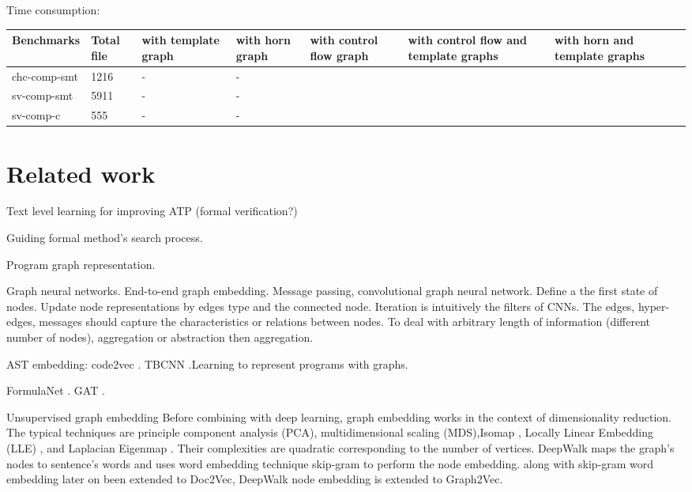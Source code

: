 \documentclass{article}
\begin{document}
Time consumption:
\begin{center}
\begin{tabular}{lp{1cm}p{1cm}p{1cm}p{1cm}p{1cm}p{1cm}p{1cm} }
\hline
Benchmarks  & Total file & with template graph & with horn graph & with control flow graph &with control flow and template graphs & with horn and template graphs\\
\hline
chc-comp-smt  & 1216 & -&-\\
sv-comp-smt  & 5911 & -&-\\
sv-comp-c  & 555 & -&-\\
\hline
\end{tabular}
\end{center}

\section{Related work}

Text level learning for improving ATP (formal verification?) \cite{NIPS2016_6280}

Guiding formal method's search process.

Program graph representation.

Graph neural networks. End-to-end graph embedding. Message passing, convolutional graph neural network.
Define a the first state of nodes. Update node representations by edges type and the connected node. Iteration is intuitively the filters of CNNs.
The edges, hyper-edges, messages should capture the characteristics or relations between nodes.
To deal with arbitrary length of information (different number of nodes), aggregation or abstraction then aggregation.

AST embedding: code2vec \cite{Alon:2019:CLD:3302515.3290353}. TBCNN \cite{DBLP:journals/corr/MouLJZW14}.Learning to represent programs with graphs\cite{DBLP:journals/corr/abs-1711-00740}.


FormulaNet \cite{NIPS2017_6871}. GAT \cite{2017arXiv171010903V}.

Unsupervised graph embedding
Before combining with deep learning, graph embedding works in the context of dimensionality reduction. 
The typical techniques are principle component analysis (PCA), multidimensional scaling (MDS),Isomap \cite{Isomap}, Locally Linear Embedding (LLE) \cite{Roweis2323}, and Laplacian Eigenmap \cite{NIPS2001_1961}. Their complexities are quadratic corresponding to the number of vertices.
DeepWalk maps the graph's nodes to sentence's words and uses word embedding technique skip-gram to perform the node embedding. along with skip-gram word embedding later on been extended to Doc2Vec, DeepWalk node embedding is extended to Graph2Vec.
\end{document}
